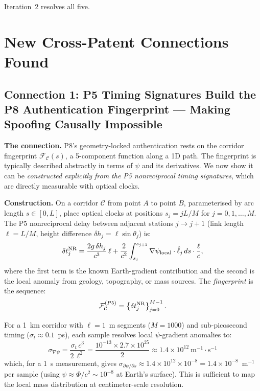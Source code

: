 \documentclass[aps,prd,twocolumn,superscriptaddress,nofootinbib]{revtex4-2}
\begin{document}
Iteration~2 resolves all five.

\section{New Cross-Patent Connections Found}
\label{sec:connections}

\subsection{Connection 1: P5 Timing Signatures Build the P8 Authentication
Fingerprint --- Making Spoofing Causally Impossible}
\label{sec:connection1}

\textbf{The connection.}  P8's geometry-locked authentication rests on the
corridor fingerprint $\mathcal{F}_{\mathcal{C}}(s)$, a 5-component function
along a 1D path.  The fingerprint is typically described abstractly in terms
of $\psi$ and its derivatives.  We now show it can be \emph{constructed
explicitly from the P5 nonreciprocal timing signatures}, which are directly
measurable with optical clocks.

\textbf{Construction.}
On a corridor $\mathcal{C}$ from point $A$ to point $B$, parameterised by
arc length $s \in [0,L]$, place optical clocks at positions $s_j = jL/M$
for $j = 0, 1, \ldots, M$.  The P5 nonreciprocal delay between adjacent
stations $j \to j+1$ (link length $\ell = L/M$, height difference
$\delta h_j = \ell\sin\theta_j$) is:
\begin{equation}
\delta t_j^{\rm NR} = \frac{2g\,\delta h_j}{c^3}\,\ell
+ \frac{2}{c^2}\int_{s_j}^{s_{j+1}} \nabla\psi_{\rm local}
\cdot \hat{\ell}_j\,ds \cdot \frac{\ell}{c},
\label{eq:finger_timing}
\end{equation}
where the first term is the known Earth-gradient contribution
and the second is the local anomaly from geology, topography, or
mass sources.  The \emph{fingerprint} is the sequence:
\begin{equation}
\mathcal{F}^{(P5)}_{\mathcal{C}} =
\left\{\delta t_j^{\rm NR}\right\}_{j=0}^{M-1}.
\label{eq:finger_sequence}
\end{equation}

For a 1~km corridor with $\ell = 1$~m segments ($M = 1000$) and
sub-picosecond timing ($\sigma_t \approx 0.1$~ps), each sample
resolves local $\psi$-gradient anomalies to:
\begin{equation}
\sigma_{\nabla\psi} = \frac{\sigma_t\,c^3}{2\,\ell^2}
= \frac{10^{-13} \times 2.7\times 10^{25}}{2} \approx 1.4\times 10^{12}~\text{m}^{-1}\cdot\text{s}^{-1}
\end{equation}
which, for a 1~s measurement, gives
$\sigma_{\partial\psi/\partial s} \approx 1.4\times 10^{12} \times 10^{-8}
= 1.4\times 10^{-8}$~m$^{-1}$ per sample
(using $\psi \approx \Phi/c^2 \sim 10^{-8}$ at Earth's surface).
This is sufficient to map the local mass distribution at centimeter-scale
resolution.
\end{document}
